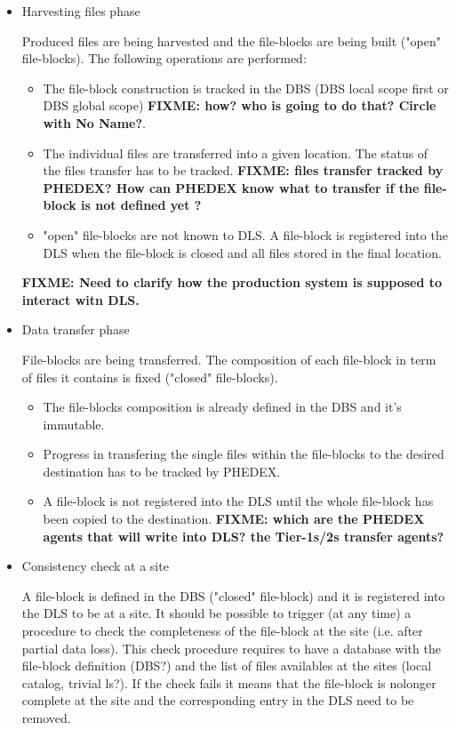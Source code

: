 \documentclass[pdftex]{cmspaper}
\begin{document}
%
\begin{itemize}

\item Harvesting files phase
 
 Produced files are being harvested and the file-blocks are being 
 built ("open" file-blocks). The following operations are performed:
 \begin{itemize}
  \item The file-block construction is tracked in the DBS (DBS local scope first 
 or DBS global scope) {\bf FIXME: how? who is going to do that? Circle with No Name?}.
  \item The individual files are transferred into a given location. The status
        of the files transfer has to be tracked. {\bf FIXME: files transfer tracked by PHEDEX? How can PHEDEX know what to transfer if the file-block is not defined yet ?}
  \item "open" file-blocks are not known to DLS. A file-block is registered
        into the DLS when the file-block is closed and all files stored 
        in the final location.
 \end{itemize}

{\bf FIXME: Need to clarify how the production system is supposed to interact witn DLS.}

\item Data transfer phase

 File-blocks are being transferred. The composition of each file-block 
 in term of files it contains is fixed ("closed" file-blocks).

 \begin{itemize}
  \item  The file-blocks composition is already defined in the DBS and 
         it's immutable.
  \item  Progress in transfering the single files within the file-blocks
         to the desired destination has to be tracked by PHEDEX.
  \item  A file-block is not registered into the DLS until the whole 
         file-block has been copied to the destination. {\bf FIXME: which are the PHEDEX agents that will write into DLS? the Tier-1s/2s transfer agents?}
 \end{itemize}

\item Consistency check at a site

 A file-block is defined in the DBS ("closed" file-block) and it is 
 registered into the DLS to be at a site. 
 It should be possible to trigger (at any time) a procedure to check 
 the completeness of the file-block at the site (i.e. after partial data loss).
 This check procedure requires to have a database with the file-block 
 definition (DBS?) and the list of files availables at the sites (local catalog, 
 trivial ls?).
 If the check fails it means that the file-block is nolonger complete at the site
 and the corresponding entry in the DLS need to be removed.

\end{itemize}
\end{document}
